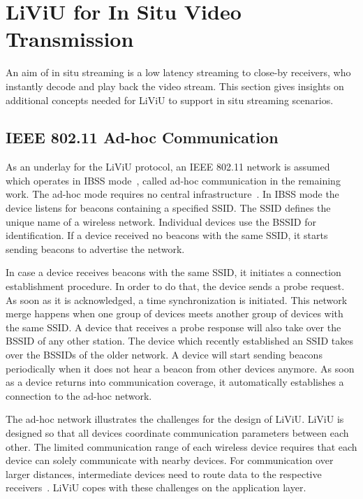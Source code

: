 \section{LiViU for In Situ Video Transmission}
\label{sec:534_AdhocLiviu}
An aim of in situ streaming is a low latency streaming to close-by receivers, who instantly decode and play back the video stream.
This section gives insights on additional concepts needed for \ac{LiViU} to support in situ streaming scenarios.
\subsection{IEEE 802.11 Ad-hoc Communication}
As an underlay for the \ac{LiViU} protocol, an IEEE 802.11 network is assumed which operates in \ac{IBSS} mode~\cite{WLANStandard2010}, called ad-hoc communication in the remaining work.
The ad-hoc mode requires no central infrastructure~\cite{Royer1999}.
In \ac{IBSS} mode the device listens for beacons containing a specified \ac{SSID}. 
The \ac{SSID} defines the unique name of a wireless network.
Individual devices use the \ac{BSSID} for identification.
If a device received no beacons with the same \ac{SSID}, it starts sending beacons to advertise the network. 

In case a device receives beacons with the same \ac{SSID}, it initiates a connection establishment procedure.
In order to do that, the device sends a probe request.
As soon as it is acknowledged, a time synchronization is initiated.
This network merge happens when one group of devices meets another group of devices with the same \ac{SSID}. 
A device that receives a probe response will also take over the \ac{BSSID} of any other station. 
The device which recently established an \ac{SSID} takes over the \ac{BSSID}s of the older network. 
A device will start sending beacons periodically when it does not hear a beacon from other devices anymore.
As soon as a device returns into communication coverage, it automatically establishes a connection to the ad-hoc network.

The ad-hoc network illustrates the challenges for the design of \ac{LiViU}.
\ac{LiViU} is designed so that all devices coordinate communication parameters between each other.
The limited communication range of each wireless device requires that each device can solely communicate with nearby devices.
For communication over larger distances, intermediate devices need to route data to the respective receivers~\cite{Royer1999}.
\ac{LiViU} copes with these challenges on the application layer.
